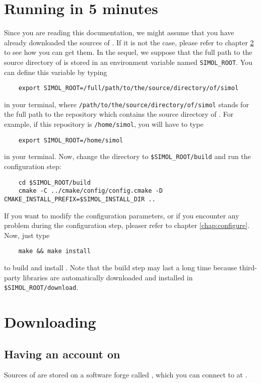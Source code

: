 
\chapter{Running \Simol in 5 minutes}


Since you are reading this documentation, we might assume that you have already downloaded the sources of \Simol. If it is not the case, please refer to chapter \ref{chap:download} to see how you can get them. In the sequel, we suppose that the full path to the source directory of \Simol is stored in an environment variable named \texttt{SIMOL\_ROOT}. You can define this variable by typing 
\begin{verbatim}
    export SIMOL_ROOT=/full/path/to/the/source/directory/of/simol
\end{verbatim}
in your terminal, where \texttt{/path/to/the/source/directory/of/simol} stands for the full path to the repository which contains the source directory of \Simol. For example, if this repository is \texttt{/home/simol}, you will have to type
\begin{verbatim}
    export SIMOL_ROOT=/home/simol
\end{verbatim}
in your terminal. Now, change the directory to \texttt{\$SIMOL\_ROOT/build} and run the configuration step:
\begin{verbatim}
    cd $SIMOL_ROOT/build
    cmake -C ../cmake/config/config.cmake -D CMAKE_INSTALL_PREFIX=$SIMOL_INSTALL_DIR ..
\end{verbatim}
If you want to modify the configuration parameters, or if you encounter any problem during the configuration step, pleaser refer to chapter \ref{chap:configure}. Now, just type
\begin{verbatim}
    make && make install
\end{verbatim}
to build and install \Simol. Note that the build step may last a long time because third-party libraries are automatically downloaded and installed in \texttt{\$SIMOL\_ROOT/download}. 

\chapter{Downloading \Simol}\label{chap:download}


\section{Having an account on \SourceSup}

Sources of \Simol are stored on a software forge called \SourceSup, which you can connect to at \urlSourceSup.  


